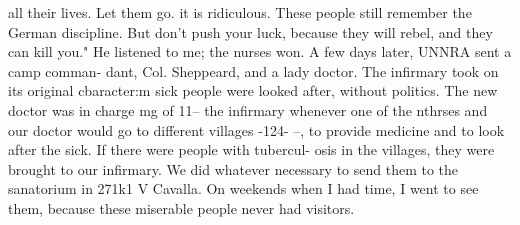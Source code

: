 all their lives. Let them go. it is ridiculous. These people still remember the 
German discipline. But don't push your luck, because they will rebel, and they can 
kill you." 
He listened to me; the nurses won. A few days later, UNNRA sent a camp comman-
dant, Col. Sheppeard, and a lady doctor. The infirmary took on its original cbaracter:m 
sick people were looked after, without politics. The new doctor was in charge mg of 11-- 
the infirmary whenever one of the nthrses and our doctor would go to different villages 
-124- 
--, to provide medicine and to look after the sick. If there were people with tubercul-
osis in the villages, they were brought to our infirmary. We did whatever necessary 
to send them to the sanatorium in 271k1 V Cavalla. On weekends when I had time, I 
went to see them, because these miserable people never had visitors. 
